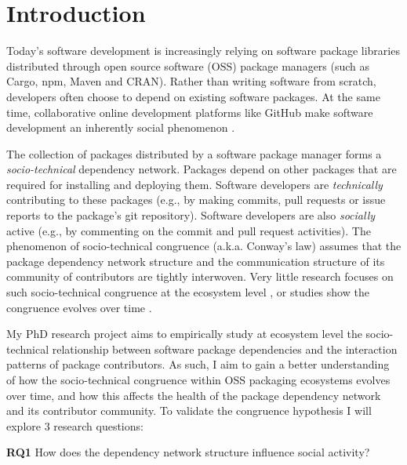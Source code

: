 \section{Introduction}
\label{sec:intro}

Today's software development is increasingly relying on software package libraries distributed through open source software (OSS) package managers (such as Cargo, npm, Maven and CRAN). Rather than writing software from scratch, developers often choose to depend on existing software packages.
At the same time, collaborative online development platforms like GitHub make software development an inherently social phenomenon \cite{DabbishSTH12,Mens2019IEEESW}.

The collection of packages distributed by a software package manager forms a \emph{socio-technical} dependency network. Packages depend on other packages that are required for installing and deploying them. Software developers are \emph{technically} contributing to these packages (e.g., by making commits, pull requests or issue reports to the package's git repository). Software developers are also \emph{socially} active (e.g., by commenting on the commit and pull request activities).
The phenomenon of socio-technical congruence (a.k.a. Conway's law) \cite{Conway1968, Herbsleb1999} assumes
that the package dependency network structure and the communication structure of its community of contributors are tightly interwoven. Very little research focuses on such socio-technical congruence at the ecosystem level \cite{Palyart2018TSE}, or studies show the congruence evolves over time \cite{Cataldo2008}.

My PhD research project %
aims to empirically study at ecosystem level the socio-technical relationship between software package dependencies and the interaction patterns of package contributors.
As such, I aim to gain a better understanding of how the socio-technical congruence within OSS packaging ecosystems evolves over time, and how this affects the health of the package dependency network and its contributor community.
To validate the congruence hypothesis %
I will explore 3 research questions: 


\noindent \textbf{RQ1} How does the dependency network structure influence social activity? %

